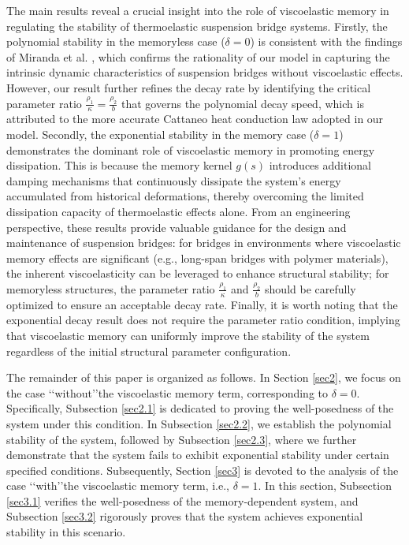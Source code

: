 \documentclass[11pt,reqno]{article}
\begin{document}
      The main results reveal a crucial insight into the role of viscoelastic memory in regulating the stability of thermoelastic suspension bridge systems. Firstly, the polynomial stability in the memoryless case ($\delta = 0$) is consistent with the findings of Miranda et al. \cite{MR4887867}, which confirms the rationality of our model in capturing the intrinsic dynamic characteristics of suspension bridges without viscoelastic effects. However, our result further refines the decay rate by identifying the critical parameter ratio $\frac{\rho_1}{\kappa} = \frac{\rho_2}{b}$ that governs the polynomial decay speed, which is attributed to the more accurate Cattaneo heat conduction law adopted in our model. Secondly, the exponential stability in the memory case ($\delta = 1$) demonstrates the dominant role of viscoelastic memory in promoting energy dissipation. This is because the memory kernel $g(s)$ introduces additional damping mechanisms that continuously dissipate the system's energy accumulated from historical deformations, thereby overcoming the limited dissipation capacity of thermoelastic effects alone. From an engineering perspective, these results provide valuable guidance for the design and maintenance of suspension bridges: for bridges in environments where viscoelastic memory effects are significant (e.g., long-span bridges with polymer materials), the inherent viscoelasticity can be leveraged to enhance structural stability; for memoryless structures, the parameter ratio $\frac{\rho_1}{\kappa}$ and $\frac{\rho_2}{b}$ should be carefully optimized to ensure an acceptable decay rate. Finally, it is worth noting that the exponential decay result does not require the parameter ratio condition, implying that viscoelastic memory can uniformly improve the stability of the system regardless of the initial structural parameter configuration.

	
The remainder of this paper is organized as follows. In Section \ref{sec2}, we focus on the case \lq\lq without\rq\rq the viscoelastic memory term, corresponding to $\delta = 0$. Specifically, Subsection \ref{sec2.1} is dedicated to proving the well-posedness of the system under this condition. In Subsection \ref{sec2.2}, we establish the polynomial stability of the system, followed by Subsection \ref{sec2.3}, where we further demonstrate that the system fails to exhibit exponential stability under certain specified conditions. Subsequently, Section \ref{sec3} is devoted to the analysis of the case \lq\lq with\rq\rq the viscoelastic memory term, i.e., $\delta = 1$. In this section, Subsection \ref{sec3.1} verifies the well-posedness of the memory-dependent system, and Subsection \ref{sec3.2} rigorously proves that the system achieves exponential stability in this scenario.
\end{document}
